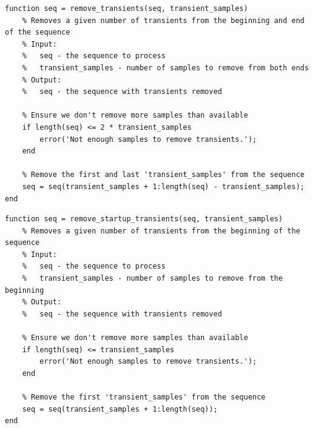 \documentclass[12pt]{article}
\begin{document}
\begin{lstlisting}[caption={remove\_transients.m}]
function seq = remove_transients(seq, transient_samples)
    % Removes a given number of transients from the beginning and end of the sequence
    % Input:
    %   seq - the sequence to process
    %   transient_samples - number of samples to remove from both ends
    % Output:
    %   seq - the sequence with transients removed

    % Ensure we don't remove more samples than available
    if length(seq) <= 2 * transient_samples
        error('Not enough samples to remove transients.');
    end

    % Remove the first and last 'transient_samples' from the sequence
    seq = seq(transient_samples + 1:length(seq) - transient_samples);
end
\end{lstlisting}

\begin{lstlisting}[caption={remove\_startup\_transients.m}]
function seq = remove_startup_transients(seq, transient_samples)
    % Removes a given number of transients from the beginning of the sequence
    % Input:
    %   seq - the sequence to process
    %   transient_samples - number of samples to remove from the beginning
    % Output:
    %   seq - the sequence with transients removed

    % Ensure we don't remove more samples than available
    if length(seq) <= transient_samples
        error('Not enough samples to remove transients.');
    end

    % Remove the first 'transient_samples' from the sequence
    seq = seq(transient_samples + 1:length(seq));
end
\end{lstlisting}
\end{document}
